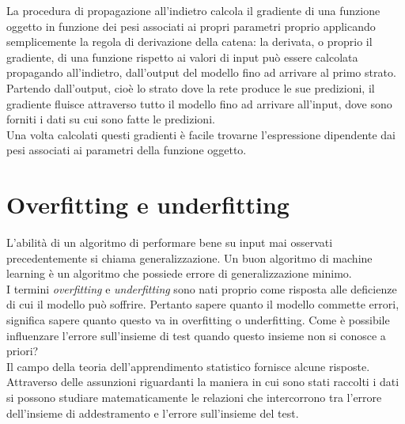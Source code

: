  La procedura di propagazione all’indietro calcola il gradiente di una funzione oggetto
  in funzione dei pesi associati ai propri parametri proprio applicando semplicemente 
  la regola di derivazione della catena: la derivata, o proprio il gradiente, di una 
  funzione rispetto ai valori di input può essere calcolata propagando all’indietro,
   dall’output del modello fino ad arrivare al primo strato. 
   Partendo dall’output, cioè lo strato dove la rete produce le sue predizioni,
    il gradiente fluisce attraverso tutto il modello fino ad arrivare all’input, 
    dove sono forniti i dati su cui sono fatte le predizioni.\\
     Una volta calcolati questi gradienti è facile trovarne l’espressione
      dipendente dai pesi associati ai parametri della funzione oggetto.\\
    


 
\section{Overfitting e underfitting}
L’abilità di un algoritmo di performare bene su input mai osservati precedentemente si chiama
 generalizzazione. Un buon algoritmo di machine learning è un algoritmo che possiede errore 
 di generalizzazione minimo. \\
I termini \emph{overfitting} e \emph{underfitting} sono nati proprio come risposta alle deficienze di cui 
il modello può soffrire. Pertanto sapere quanto il modello commette errori, significa sapere
 quanto questo va in overfitting o underfitting. 
Come è possibile influenzare l’errore sull’insieme di test quando 
questo insieme non si conosce a priori?\\
 Il campo della teoria dell’apprendimento statistico fornisce 
alcune risposte. Attraverso delle assunzioni riguardanti la maniera in cui sono stati raccolti
 i dati si possono studiare matematicamente le relazioni che intercorrono tra l’errore dell’insieme
  di addestramento e l’errore sull’insieme del test.

